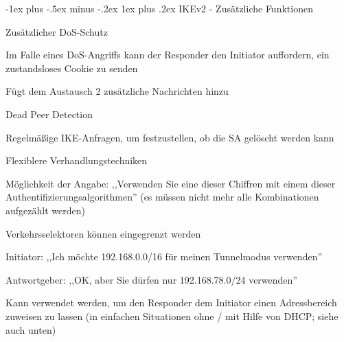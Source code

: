 \documentclass[a4paper]{article}
\makeatletter
\renewcommand{\subsubsection}{\@startsection{subsubsection}{3}{0mm}%
 {-1ex plus -.5ex minus -.2ex}%
 {1ex plus .2ex}%
 {\normalfont\small\bfseries}}
\makeatother
\begin{document}
\begin{multicols}{3}
\begin{itemize*}
            \subsubsection{IKEv2 - Zusätzliche Funktionen}
            \begin{itemize*}
                  \item Zusätzlicher DoS-Schutz
                  \begin{itemize*}
                        \item Im Falle eines DoS-Angriffs kann der Responder den Initiator auffordern, ein zustandsloses Cookie zu senden
                        \item Fügt dem Austausch 2 zusätzliche Nachrichten hinzu
                  \end{itemize*}
                  \item Dead Peer Detection
                  \begin{itemize*}
                        \item Regelmäßige IKE-Anfragen, um festzustellen, ob die SA gelöscht werden kann
                  \end{itemize*}
                  \item Flexiblere Verhandlungstechniken
                  \begin{itemize*}
                        \item Möglichkeit der Angabe: ,,Verwenden Sie eine dieser Chiffren mit einem dieser Authentifizierungsalgorithmen'' (es müssen nicht mehr alle Kombinationen aufgezählt werden)
                        \item Verkehrsselektoren können eingegrenzt werden
                        \begin{itemize*}
                              \item Initiator: ,,Ich möchte 192.168.0.0/16 für meinen Tunnelmodus verwenden''
                              \item Antwortgeber: ,,OK, aber Sie dürfen nur 192.168.78.0/24 verwenden''
                              \item Kann verwendet werden, um den Responder dem Initiator einen Adressbereich zuweisen zu lassen (in einfachen Situationen ohne / mit Hilfe von DHCP; siehe auch unten)
                        \end{itemize*}
                  \end{itemize*}
            \end{itemize*}



\end{itemize*}
\end{multicols}
\end{document}
